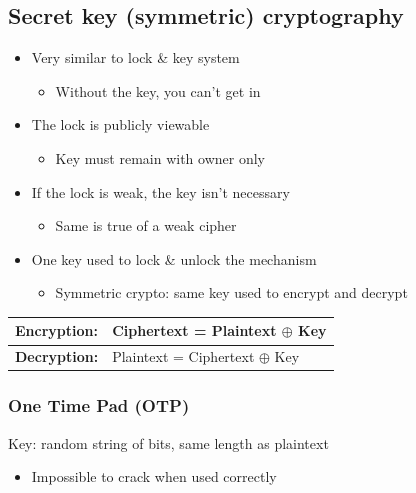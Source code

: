 \subsection{Secret key (symmetric) cryptography}

\begin{itemize}
  \item Very similar to lock \& key system
  \begin{itemize}
    \item Without the key, you can't get in
  \end{itemize}
  \item The lock is publicly viewable
  \begin{itemize}
    \item Key must remain with owner only
  \end{itemize}
  \item If the lock is weak, the key isn't necessary
  \begin{itemize}
    \item Same is true of a weak cipher
  \end{itemize}
  \item One key used to lock \& unlock the mechanism
  \begin{itemize}
    \item Symmetric crypto: same key used to encrypt and decrypt
  \end{itemize}
\end{itemize}
\begin{tabular}{|l|l|}
  \hline
  \textbf{Encryption:} & Ciphertext = Plaintext $\oplus$ Key\\
  \hline
  \textbf{Decryption:} & Plaintext = Ciphertext $\oplus$ Key\\
  \hline
\end{tabular}

\subsubsection{One Time Pad (OTP)}
Key: random string of bits, same length as plaintext
\begin{itemize}
  \item Impossible to crack when used correctly
\end{itemize}

